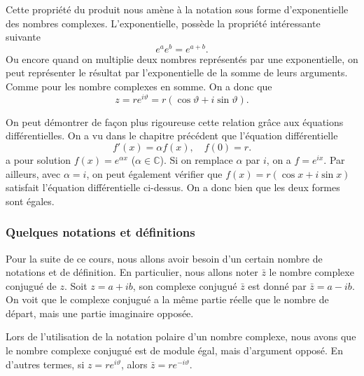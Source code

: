 \documentclass[a4paper,12pt]{book}
\newcommand{\complex}{\mathbb{C}}
\newcommand{\zbar}{\bar{z}}
\begin{document}
Cette propriété du produit nous amène à la notation sous forme d'exponentielle des nombres complexes.
L'exponentielle, possède la propriété intéressante suivante
\begin{equation}
 e^a e^b=e^{a+b}.
\end{equation}
Ou encore quand on multiplie deux nombres représentés par une exponentielle, on peut représenter
le résultat par l'exponentielle de la somme de leurs arguments. Comme pour les nombre complexes 
en somme. On a donc que
\begin{equation}
 z=re^{i\vartheta}=r(\cos\vartheta+i\sin\vartheta).
\end{equation}

On peut démontrer de façon plus rigoureuse cette relation grâce aux équations différentielles.
On a vu dans le chapitre précédent que l'équation différentielle
\begin{equation}
 f'(x)=\alpha f(x),\quad f(0)=r.
\end{equation}
a pour solution $f(x)=e^{\alpha x}$ ($\alpha\in\complex$). Si on remplace $\alpha$ par $i$, on a
$f=e^{ix}$. Par ailleurs, avec $\alpha=i$, on peut également vérifier que $f(x)=r(\cos x+i\sin x)$ 
satisfait l'équation différentielle ci-dessus. On a donc bien que les deux formes sont 
égales.

\subsubsection{Quelques notations et définitions}

Pour la suite de ce cours, nous allons avoir besoin d'un certain nombre 
de notations et de définition. En particulier, nous allons noter $\bar{z}$
le nombre complexe conjugu\'e de $z$. Soit $z=a+ib$, son complexe conjugué $\zbar$
est donné par $\zbar=a-ib$. On voit que le complexe conjugué a la même partie réelle
que le nombre de départ, mais une partie imaginaire opposée. 

Lors de l'utilisation de la notation polaire d'un nombre complexe, nous avons que le nombre complexe conjugué est 
de module égal, mais 
d'argument opposé. En d'autres termes, si $z=re^{i\vartheta}$, alors $\zbar=re^{-i\vartheta}$.
\end{document}
